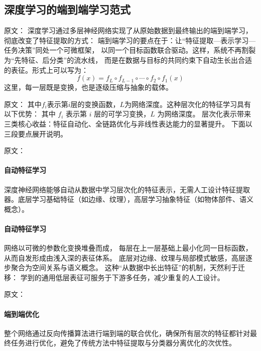 \subsection{深度学习的端到端学习范式}

原文：
深度学习通过多层神经网络实现了从原始数据到最终输出的端到端学习，彻底改变了特征提取的方式：
端到端学习的要点在于：让“特征提取—表示学习—任务决策”同处一个可微框架，  
以同一个目标函数联合驱动。这样，系统不再割裂为“先特征、后分类”的流水线，  
而是在数据与目标的共同约束下自动生长出合适的表征。形式上可以写为：
\begin{equation}
f(x) = f_L \circ f_{L-1} \circ \cdots \circ f_2 \circ f_1(x)
\end{equation}
这里，每一层既是变换，也是逐级压缩与抽象的载体。

原文：
其中$f_i$表示第$i$层的变换函数，$L$为网络深度。这种层次化的特征学习具有以下优势：
其中 $f_i$ 表示第 $i$ 层的可学习变换，$L$ 为网络深度。  
层次化表示带来三类核心收益：特征自动化、全链路优化与非线性表达能力的显著提升。  
下面以三段要点展开说明。

原文：
\paragraph{自动特征学习}
深度神经网络能够自动从数据中学习层次化的特征表示，无需人工设计特征提取器。底层学习基础特征（如边缘、纹理），高层学习抽象特征（如物体部件、语义概念）。
\paragraph{自动特征学习}
网络以可微的参数化变换堆叠而成，  
每层在上一层基础上最小化同一目标函数，从而自发形成由浅入深的表征体系。  
底层对边缘、纹理与局部模式敏感，高层逐步聚合为空间关系与语义概念。  
这种“从数据中长出特征”的机制，天然利于迁移：  
学到的通用低层表征可服务于下游多任务，减少重复的人工设计。

原文：
\paragraph{端到端优化}
整个网络通过反向传播算法进行端到端的联合优化，确保所有层次的特征都针对最终任务进行优化，避免了传统方法中特征提取与分类器分离优化的次优性。
